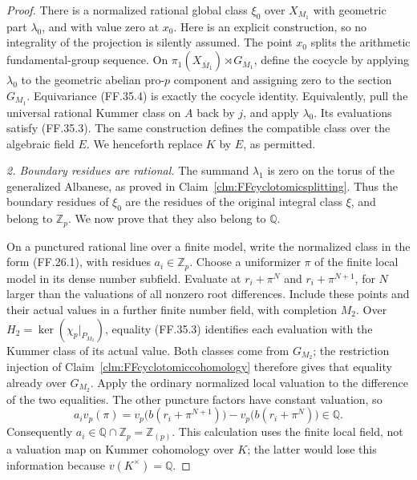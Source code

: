 \begin{proof}
There is a normalized rational global class
\(\xi_0\) over \(X_{M_1}\) with geometric part
\(\lambda_0\), and with value zero at \(x_0\).
Here is an explicit construction, so no integrality
of the projection is silently assumed. The point
\(x_0\) splits the arithmetic fundamental-group
sequence. On
\(\pi_1(X_{\overline M_1})\rtimes G_{M_1}\),
define the cocycle by applying \(\lambda_0\)
to the geometric abelian pro-\(p\) component
and assigning zero to the section \(G_{M_1}\).
Equivariance (FF.35.4) is exactly the cocycle
identity. Equivalently, pull the universal rational
Kummer class on \(A\) back by \(j\), and apply
\(\lambda_0\). Its evaluations satisfy (FF.35.3).
The same construction defines the compatible
class over the algebraic field \(E\).
We henceforth replace \(K\) by \(E\), as permitted.

\emph{2. Boundary residues are rational.}
The summand \(\lambda_1\) is zero on the torus
of the generalized Albanese, as proved in
Claim~\ref{clm:FFcyclotomicsplitting}. Thus the
boundary residues of \(\xi_0\) are the residues
of the original integral class \(\xi\), and
belong to \(\mathbb Z_p\). We now prove that
they also belong to \(\mathbb Q\).

On a punctured rational line over a finite model,
write the normalized class in the form (FF.26.1),
with residues \(a_i\in\mathbb Z_p\). Choose
a uniformizer \(\pi\) of the finite local model
in its dense number subfield. Evaluate at
\(r_i+\pi^N\) and \(r_i+\pi^{N+1}\), for \(N\)
larger than the valuations of all nonzero root
differences. Include these points and their
actual values in a further finite number field,
with completion \(M_2\). Over
\(H_2=\ker(\chi_p|_{P_{M_2}})\), equality
(FF.35.3) identifies each evaluation with the
Kummer class of its actual value. Both classes
come from \(G_{M_2}\); the restriction injection
of Claim~\ref{clm:FFcyclotomiccohomology} therefore
gives that equality already over \(G_{M_2}\).
Apply the ordinary normalized local valuation
to the difference of the two equalities. The
other puncture factors have constant valuation,
so
\[
        a_i v_p(\pi)
           =v_p\bigl(b(r_i+\pi^{N+1})\bigr)
                -v_p\bigl(b(r_i+\pi^N)\bigr)
                    \in\mathbb Q.
                                                        \tag{FF.35.5}
\]
Consequently \(a_i\in\mathbb Q\cap\mathbb Z_p
=\mathbb Z_{(p)}\).
This calculation uses the finite local field,
not a valuation map on Kummer cohomology over
\(K\); the latter would lose this information
because \(v(K^\times)=\mathbb Q\).


\end{proof}

